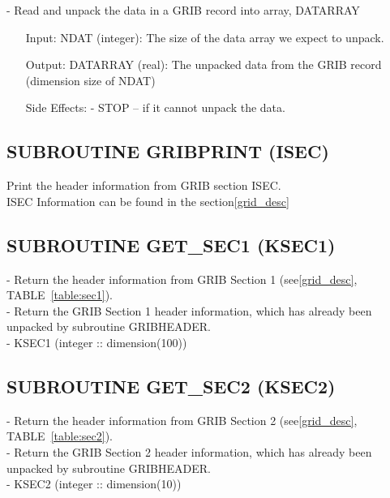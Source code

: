       - Read and unpack the data in a GRIB record into array, DATARRAY

\begin{itemize}
 \item[Input:]                                                    
    NDAT (integer):  The size of the data array we expect to unpack.                  
                                                                            
\item[ Output:]                                                        
    DATARRAY (real):  The unpacked data from the GRIB record (dimension size of NDAT)  
\item[ Side Effects:] 
   - STOP -- if it cannot unpack the data.  
\end{itemize}



\subsection{ SUBROUTINE GRIBPRINT (ISEC)   }

 Print the header information from GRIB section ISEC.\\
 ISEC Information can be found in the section\ref{grid_desc}\\

\subsection{SUBROUTINE GET\_SEC1 (KSEC1)}

      - Return the header information from GRIB Section 1 (see\ref{grid_desc}, TABLE~\ref{table:sec1}). \\
      - Return the GRIB Section 1 header information, which has already been 
         unpacked by subroutine GRIBHEADER. \\
      - KSEC1 (integer :: dimension(100))     \\  
                                                                    

\subsection{ SUBROUTINE GET\_SEC2 (KSEC2) }

      - Return the header information from GRIB Section 2 (see\ref{grid_desc}, TABLE~\ref{table:sec2}).\\
      - Return the GRIB Section 2 header information, which has already been
          unpacked by subroutine GRIBHEADER.    \\
      - KSEC2 (integer :: dimension(10))         \\
                                                                           
